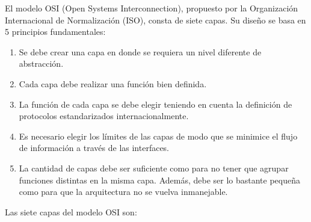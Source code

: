 El modelo OSI (Open Systems Interconnection), propuesto por la Organización Internacional de Normalización (ISO), consta de siete capas. Su diseño se basa en 5 principios fundamentales:

\begin{enumerate}
  \item Se debe crear una capa en donde se requiera un nivel diferente de abstracción.
  \item Cada capa debe realizar una función bien definida.
  \item La función de cada capa se debe elegir teniendo en cuenta la definición de protocolos estandarizados internacionalmente.
  \item Es necesario elegir los límites de las capas de modo que se minimice el flujo de información a través de las interfaces.
  \item La cantidad de capas debe ser suficiente como para no tener que agrupar funciones distintas en la misma capa. Además, debe ser lo bastante pequeña como para que la arquitectura no se vuelva inmanejable.
\end{enumerate}

Las siete capas del modelo OSI son:

